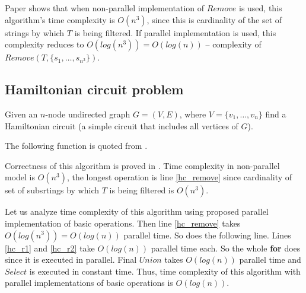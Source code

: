 
Paper \cite{Katsanyi:2003} shows that when non-parallel implementation of $Remove$ is used, this algorithm's time complexity is $O(n^3)$, since this is cardinality of the set of strings by which $T$ is being filtered. If parallel implementation is used, this complexity reduces to $O(log(n^3))=O(log(n))$ -- complexity of $Remove(T, \{s_1, \dots, s_{n^3}\})$.

\subsection{Hamiltonian circuit problem}

Given an $n$-node undirected graph $G = (V, E)$, where $V=\{v_1, \dots, v_n\}$ find a Hamiltonian circuit (a simple circuit that includes all vertices of $G$).

The following function is quoted from \cite{Katsanyi:2003}.


Correctness of this algorithm is proved in \cite{Katsanyi:2003}. Time complexity in non-parallel model is $O(n^3)$, the longest operation is line \ref{hc_remove} since cardinality of set of subsrtings by which $T$ is being filtered is $O(n^3)$.

Let us analyze time complexity of this algorithm using proposed parallel implementation of basic operations. Then line \ref{hc_remove} takes $O(log(n^3))=O(log(n))$ parallel time. So does the following line. Lines \ref{hc_r1} and \ref{hc_r2} take $O(log(n))$ parallel time each. So the whole {\bf for} does since it is executed in parallel. Final $Union$ takes $O(log(n))$ parallel time and $Select$ is executed in constant time. Thus, time complexity of this algorithm with parallel implementations of basic operations is $O(log(n))$.

